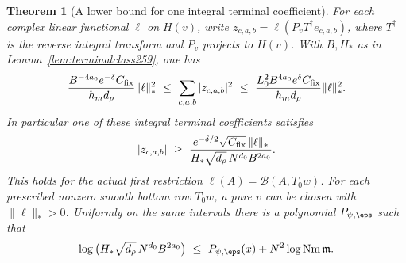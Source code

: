 \documentclass[a4paper,11pt]{article}
\newtheorem{theorem}[proposition]{Theorem}
\theoremstyle{definition}
\theoremstyle{remark}
\numberwithin{equation}{section}
\begin{document}
\begin{theorem}[A lower bound for one integral terminal coefficient]\leavevmode
\label{thm:individual259}
For each complex linear functional \(\ell\) on \(H(v)\), write
\(z_{c,a,b}=\ell(P_vT^\dagger e_{c,a,b})\), where \(T^\dagger\)
is the reverse integral transform and \(P_v\) projects to \(H(v)\).
With \(B,H_*\) as in Lemma~\ref{lem:terminalclass259}, one has
\[
 \frac{B^{-4a_0} e^{-\delta} C_{\rm fix}}{h_m d_\rho}\|\ell\|_*^2
 \ \le\ \sum_{c,a,b}|z_{c,a,b}|^2\ \le\
 \frac{L_0^2 B^{4a_0}e^\delta C_{\rm fix}}{h_m d_\rho}\|\ell\|_*^2.
\]
In particular one of these integral terminal coefficients satisfies
\[
 |z_{c,a,b}|\ \ge\
 \frac{e^{-\delta/2}\sqrt{C_{\rm fix}}\,\|\ell\|_*}
      {H_*\sqrt{d_\rho}\,N^{d_0} B^{2a_0}}.
\]
This holds for the actual first restriction
\(\ell(A)=\mathcal B(A,T_0w)\). For each prescribed nonzero
smooth bottom row \(T_0w\), a pure \(v\) can be chosen with
\(\|\ell\|_*>0\). Uniformly on the same intervals there is a
polynomial \(P_{\psi,\eps}\) such that
\[
 \log\big(H_*\sqrt{d_\rho}\,N^{d_0}B^{2a_0}\big)
 \ \le\ P_{\psi,\eps}(x)+N^2\log\operatorname{Nm}\mathfrak m .
\]
\end{theorem}
\end{document}
